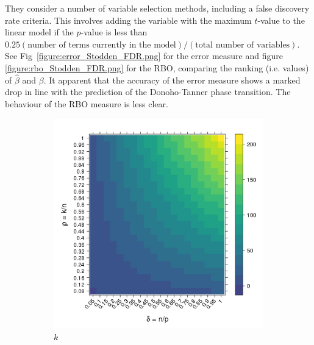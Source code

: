 \documentclass[11pt]{article}
\begin{document}
They consider a number of variable selection methods, including a false discovery rate criteria. This involves adding
the variable with the maximum $t$-value to the linear model if the $p$-value is less than
$0.25(\text{number of terms currently in the model})/(\text{total number of variables})$.  See
Fig~\ref{figure:error_Stodden_FDR.png} for the error measure and figure \ref{figure:rbo_Stodden_FDR.png} for the RBO,
comparing the ranking (i.e. values) of $\hat{\beta}$ and $\beta$. It apparent that the accuracy of the  error measure
shows a marked drop in line with the prediction of the Donoho-Tanner phase transition. The behaviour of the RBO measure
is less clear.

\begin{figure}[tbhp] 
    \begin{subfigure} [b]{0.5\linewidth}
      \centering
      \includegraphics[totalheight=6cm]{./figs/k.png}
      \caption{$k$}
      \label{figure:k.png}
    \end{subfigure} 
    \begin{subfigure}[b]{0.5\linewidth}
      \centering

\end{subfigure}
\end{figure}
\end{document}
